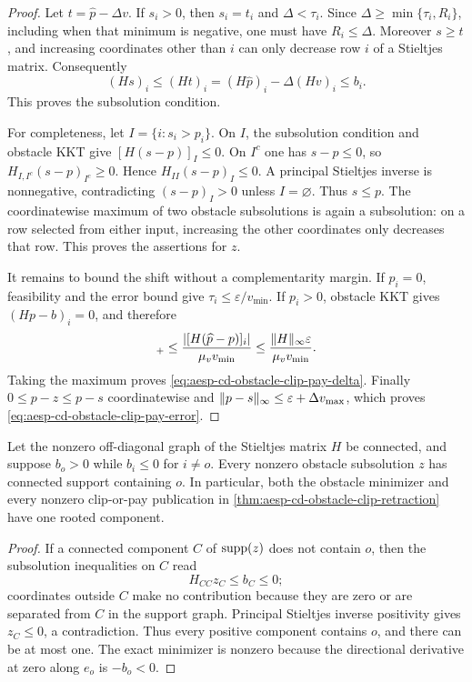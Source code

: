 \begin{proof}
Let $t=\widehat p-\Delta v$.  If $s_i>0$, then
$s_i=t_i$ and $\Delta<\tau_i$.  Since
$\Delta\geq\min\{\tau_i,R_i\}$, including when that minimum is negative,
one must have $R_i\leq\Delta$.  Moreover $s\geq t$, and increasing
coordinates other than $i$ can only decrease row $i$ of a Stieltjes matrix.
Consequently
\begin{equation*}
 (Hs)_i\leq(Ht)_i=(H\widehat p)_i-\Delta(Hv)_i\leq b_i.
\end{equation*}
This proves the subsolution condition.

For completeness, let $I=\{i:s_i>p_i\}$.  On $I$, the subsolution
condition and obstacle KKT give $[H(s-p)]_I\leq0$.  On $I^c$ one has
$s-p\leq0$, so $H_{I,I^c}(s-p)_{I^c}\geq0$.  Hence
$H_{II}(s-p)_I\leq0$.  A principal Stieltjes inverse is nonnegative,
contradicting $(s-p)_I>0$ unless $I=\varnothing$.  Thus $s\leq p$.
The coordinatewise maximum of two obstacle subsolutions is again a
subsolution: on a row selected from either input, increasing the other
coordinates only decreases that row.  This proves the assertions for $z$.

It remains to bound the shift without a complementarity margin.  If
$p_i=0$, feasibility and the error bound give
$\tau_i\leq\varepsilon/v_{\min}$.  If $p_i>0$, obstacle KKT gives
$(Hp-b)_i=0$, and therefore
\begin{equation*}
 [R_i]_+
 \leq\frac{|[H(\widehat p-p)]_i|}{\mu_vv_{\min}}
 \leq\frac{\norm{H}_\infty\varepsilon}{\mu_vv_{\min}}.
\end{equation*}
Taking the maximum proves
\cref{eq:aesp-cd-obstacle-clip-pay-delta}.  Finally
$0\leq p-z\leq p-s$ coordinatewise and
$\lVert p-s\rVert_\infty\leq\varepsilon+\Delta v_{\max}$, which proves
\cref{eq:aesp-cd-obstacle-clip-pay-error}.
\end{proof}

\begin{lemma}
\label{lem:aesp-cd-point-source-subsolution-connected}
Let the nonzero off-diagonal graph of the Stieltjes matrix $H$ be connected,
and suppose $b_o>0$ while $b_i\leq0$ for $i\neq o$.  Every nonzero obstacle
subsolution $z$ has connected support containing $o$.  In particular, both
the obstacle minimizer and every nonzero clip-or-pay publication in
\cref{thm:aesp-cd-obstacle-clip-retraction} have one rooted component.
\end{lemma}

\begin{proof}
If a connected component $C$ of $\operatorname{supp}(z)$ does not contain $o$, then the
subsolution inequalities on $C$ read
\begin{equation*}
 H_{CC}z_C\leq b_C\leq0;
\end{equation*}
coordinates outside $C$ make no contribution because they are zero or are
separated from $C$ in the support graph.  Principal Stieltjes inverse
positivity gives $z_C\leq0$, a contradiction.  Thus every positive component
contains $o$, and there can be at most one.  The exact minimizer is nonzero
because the directional derivative at zero along $e_o$ is $-b_o<0$.
\end{proof}

